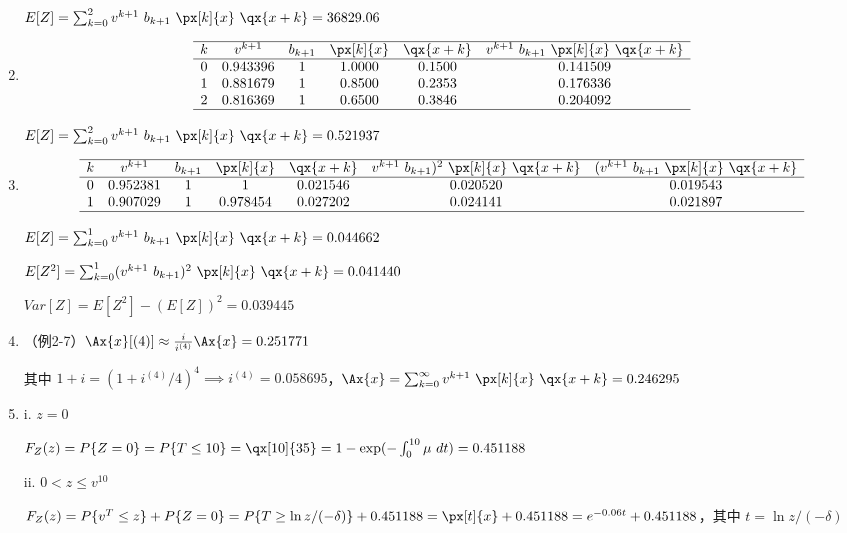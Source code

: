 \documentclass[utf8]{ctexart}
\def\lt{<}
\begin{document}
\begin{enumerate}
    $E[Z] = \sum_{k=0}^{2} v^{k+1}~b_{k+1}~\px[k]{x}~\qx{x+k} = 36829.06$

    \item $$\begin{array}{cccccc}
    \hline
    k & v^{k+1}     & b_{k+1} & \px[k]{x} & \qx{x+k} & v^{k+1}~b_{k+1}~\px[k]{x}~\qx{x+k}\\
    \hline
    0     & 0.943396 & 1     & 1.0000 & 0.1500 & 0.141509 \\
    1     & 0.881679 & 1     & 0.8500 & 0.2353 & 0.176336 \\
    2     & 0.816369 & 1     & 0.6500 & 0.3846 & 0.204092 \\
    \hline
    \end{array}$$

    $E[Z] = \sum_{k=0}^{2} v^{k+1}~b_{k+1}~\px[k]{x}~\qx{x+k} = 0.521937$

    \item $$\begin{array}{ccccccc}
    \hline
    k & v^{k+1}     & b_{k+1} & \px[k]{x} & \qx{x+k} & v^{k+1}~b_{k+1})^{2}~\px[k]{x}~\qx{x+k} & (v^{k+1}~b_{k+1}~\px[k]{x}~\qx{x+k}\\
    \hline
    0     & 0.952381 & 1     & 1        & 0.021546 & 0.020520 & 0.019543 \\
    1     & 0.907029 & 1     & 0.978454 & 0.027202 & 0.024141 & 0.021897 \\
    \hline
    \end{array}$$

    $E[Z] = \sum_{k=0}^{1} v^{k+1}~b_{k+1}~\px[k]{x}~\qx{x+k} = 0.044662$

    $E[Z^{2}] = \sum_{k=0}^{1} (v^{k+1}~b_{k+1})^{2}~\px[k]{x}~\qx{x+k} = 0.041440$

    $Var[Z] = E[Z^{2}] - (E[Z])^{2} = 0.039445$

    \item （例2-7）$\Ax{x}[(4)]\approx \frac{i}{i^{(4)}}\Ax{x} = 0.251771$

    其中 $1+i = (1+i^{(4)}/4)^{4}\implies i^{(4)} = 0.058695$，$\Ax{x} = \sum_{k=0}^{\infty} v^{k+1}~\px[k]{x}~\qx{x+k} = 0.246295$

    \item i. $z = 0$

    $F_{Z}(z) = P\{Z=0\} = P\{T\le 10\} = \qx[10]{35} = 1-\exp(-\int_{0}^{10} \mu~dt) = 0.451188$

    ii. $0\lt z\le v^{10}$

    $F_{Z}(z) = P\{v^{T}\le z\} + P\{Z=0\} = P\{T\ge\ln z/(-\delta)\} + 0.451188 = \px[t]{x} + 0.451188 = e^{-0.06t} + 0.451188$，其中 $t = \ln z/(-\delta)$


\end{enumerate}
\end{document}
